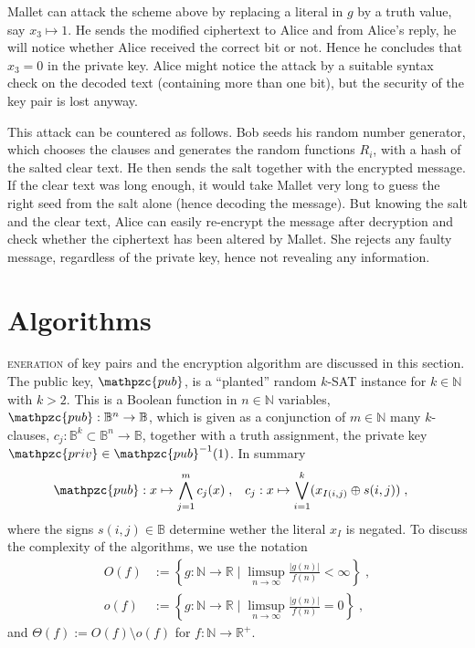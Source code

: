 \documentclass[final,journal,compsoc]{IEEEtran}
\newcommand{\priv}{\mathpzc{priv}}
\newcommand{\pub}{\mathpzc{pub}}
\begin{document}
Mallet can attack the scheme above by replacing a literal in
$g$ by a truth value, say $x_3\mapsto 1$. He sends the modified ciphertext to Alice and
from Alice's reply, he will notice whether Alice received the correct
bit or not. Hence he concludes that $x_3=0$ in the private key.  Alice
might notice the attack by a suitable syntax check on the decoded
text (containing more than one bit), but the security of the key pair
is lost anyway. 

This attack can be countered as follows. Bob seeds his random number
generator, which chooses the clauses and generates the random
functions  $R_i$, with a hash of the 
salted clear text. He then sends the salt
together with the encrypted message. If the clear text was long
enough, it would take Mallet very long to guess the right seed from the
salt alone (hence decoding the message). But knowing the salt and the
clear text, Alice can easily re-encrypt the message after decryption
and check whether the ciphertext has been altered by Mallet. She  rejects
any faulty message, regardless of the private key, hence not
revealing any information.



\section{Algorithms\label{sec:single-key}}

\textsc{eneration} of key pairs and the 
encryption algorithm are discussed in this section.   The public key, $\pub$, is a
``planted'' random $k$-SAT instance for $k\in \mathbb N$ with
$k>2$. This is a Boolean function in $n \in \mathbb N$ variables,
$\pub:\mathbb B^n \to \mathbb B$, which is given as a conjunction of
$m \in \mathbb N$ many
$k$-clauses, $c_j: \mathbb B^k \subset \mathbb B^n \to \mathbb B$, together with a truth
assignment, the private key $\priv \in \pub^{-1}(1)$.   In summary
\begin{align}
\pub &: x \mapsto \bigwedge_{j=1}^m c_j(x)\;,&c_j &: x \mapsto \bigvee_{i=1}^k (x_{I(i,j)} \oplus s(i,j))\;,
\end{align}
where the signs $s(i,j)\in \mathbb B$ determine wether the literal
$x_I$ is negated.
To discuss the complexity of the algorithms, we use the notation
\begin{align}
O(f)&:= \left\{g:\mathbb N \to \mathbb R \;\big|\;
\limsup_{n\to\infty}\frac{|g(n)|}{f(n)}<\infty \right\} \;,\\
o(f)&:=\left\{g:\mathbb N \to \mathbb R \;\big|\;
\limsup_{n\to\infty}\frac{|g(n)|}{f(n)}=0\right\}\;,
\end{align}
and $\Theta(f):=O(f)\setminus o(f)$ for $f:\mathbb N \to \mathbb R^+$.
\end{document}
